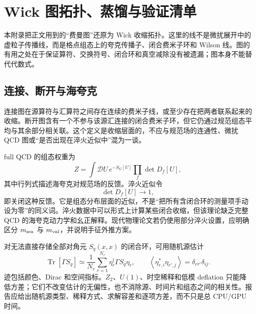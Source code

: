 \chapter{Wick 图拓扑、蒸馏与验证清单}\label{sec:b02-appendix}
本附录把正文用到的“费曼图”还原为 Wick 收缩拓扑。这里的线不是微扰展开中的虚粒子传播线，而是格点组态上的夸克传播子、闭合费米子环和 Wilson 线。图的有用之处在于保证算符、交换符号、闭合环和真空减除没有被遗漏；图本身不能替代代数式。

\section{连接、断开与海夸克}\label{subsec:b02-topology}

连接图在源算符与汇算符之间存在连续的费米子线，或至少存在把两者联系起来的收缩。断开图含有一个不参与该源汇连接的闭合费米子环，但它仍通过规范组态平均与其余部分相关联。这个定义是收缩层面的，不应与规范场的连通性、微扰 QCD 图或“是否出现在淬火近似中”混为一谈。

full QCD 的组态权重为
\begin{equation}
  Z=\int\mathcal DU\,e^{-S_G[U]}\prod_f\det D_f[U],
  \label{eq:b02-qcd-weight}
\end{equation}
其中行列式描述海夸克对规范场的反馈。淬火近似令
\begin{equation}
  \det D_f[U]\longrightarrow1,
  \label{eq:b02-quench}
\end{equation}
即关闭这种反馈。它是组态分布层面的近似，不是“把所有含闭合环的测量项手动设为零”的同义词。淬火数据中可以形式上计算某些闭合收缩，但该理论缺乏完整 QCD 的海夸克动力学和幺正解释。现代物理论文若仍使用部分淬火设置，应明确区分 \(m_{\rm sea}\) 与 \(m_{\rm val}\)，并说明手征外推方案。

对无法直接存储全部对角元 \(S_q(x,x)\) 的闭合环，可用随机源估计
\begin{equation}
  \operatorname{Tr}\!\left[\Gamma S_q\right]
  \simeq
  \frac1{N_r}\sum_{r=1}^{N_r}
  \eta_r^\dagger\Gamma S_q\eta_r,
  \qquad
  \left\langle\eta_{r,i}^*\eta_{r',j}\right\rangle
  =\delta_{rr'}\delta_{ij}.
  \label{eq:b02-stochastic-trace}
\end{equation}
迹包括颜色、Dirac 和空间指标。$Z_2$、$U(1)$、时空稀释和低模 deflation 只能降低方差；它们不改变估计的无偏性，也不消除源、时间片和组态之间的相关性。报告应给出随机源类型、稀释方式、求解容差和逐项方差，而不只是总 CPU/GPU 时间。

